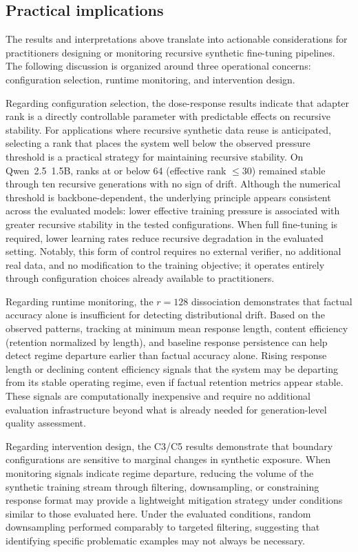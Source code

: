 \documentclass[a4paper,fleqn]{cas-dc}
\begin{document}
\subsection{Practical implications}\label{sec:disc_practical}

The results and interpretations above translate into actionable considerations
for practitioners designing or monitoring recursive synthetic fine-tuning
pipelines. The following discussion is organized around three operational concerns: configuration
selection, runtime monitoring, and intervention design.

Regarding configuration selection, the dose-response results indicate that
adapter rank is a directly controllable parameter with predictable effects on
recursive stability. For applications where recursive synthetic data reuse is
anticipated, selecting a rank that places the system well below the observed
pressure threshold is a practical strategy for maintaining recursive stability.
On Qwen~2.5~1.5B, ranks at or below 64 (effective rank $\leq 30$) remained
stable through ten recursive generations with no sign of drift. Although
the numerical threshold is backbone-dependent, the underlying principle appears
consistent across the evaluated models: lower effective training pressure is
associated with greater recursive stability in the tested configurations. When
full fine-tuning is required, lower learning rates reduce recursive degradation
in the evaluated setting. Notably, this form of control requires no external
verifier, no additional real data, and no modification to the training objective;
it operates entirely through configuration choices already available to
practitioners.

Regarding runtime monitoring, the $r=128$ dissociation demonstrates that factual
accuracy alone is insufficient for detecting distributional drift. Based on the
observed patterns, tracking at minimum mean response length, content efficiency
(retention normalized by length), and baseline response persistence can help
detect regime departure earlier than factual accuracy alone. Rising response
length or declining content efficiency signals that the system may be departing
from its stable operating regime, even if factual retention metrics appear
stable. These signals are computationally inexpensive and require no additional
evaluation infrastructure beyond what is already needed for generation-level
quality assessment.

Regarding intervention design, the C3/C5 results demonstrate that boundary
configurations are sensitive to marginal changes in synthetic exposure. When
monitoring signals indicate regime departure, reducing the volume of the
synthetic training stream through filtering, downsampling, or constraining
response format may provide a lightweight mitigation strategy under conditions
similar to those evaluated here. Under the evaluated conditions, random
downsampling performed comparably to targeted filtering, suggesting that
identifying specific problematic examples may not always be necessary.
\end{document}
